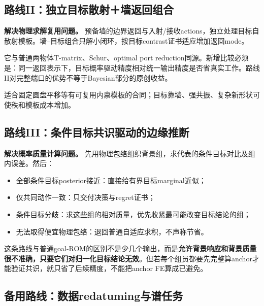 \documentclass[
  10pt,
  a4paper,
]{article}
\providecommand{\tightlist}{%
  \setlength{\itemsep}{0pt}\setlength{\parskip}{0pt}}
\providecommand{\tightlist}{\setlength{\itemsep}{1pt}\setlength{\parskip}{1pt}}
\begin{document}
\hypertarget{ux8defux7ebfiiux72ecux7acbux76eeux6807ux6563ux5c04ux5899ux8fd4ux56deux7ec4ux5408}{%
\subsection{路线II：独立目标散射＋墙返回组合}\label{ux8defux7ebfiiux72ecux7acbux76eeux6807ux6563ux5c04ux5899ux8fd4ux56deux7ec4ux5408}}

\textbf{解决物理求解复用问题。}
预备墙的边界返回与入射/接收actions，独立处理目标自散射模板。墙--目标组合只解小闭环，按目标contrast证书适应增加返回mode。

它与普通两物体T-matrix、Schur、optimal port
reduction同源。新增比较必须是：同一返回表示下，目标概率驱动精度相对统一输出精度是否省真实工作。路线II对完整端口的优势不等于Bayesian部分的原创收益。

适合固定圆盘平移等有可复用内禀模板的合同；目标靠墙、强共振、复杂新形状可使秩和模板成本增加。

\hypertarget{ux8defux7ebfiiiux6761ux4ef6ux76eeux6807ux5171ux8bc6ux9a71ux52a8ux7684ux8fb9ux7f18ux63a8ux65ad}{%
\subsection{路线III：条件目标共识驱动的边缘推断}\label{ux8defux7ebfiiiux6761ux4ef6ux76eeux6807ux5171ux8bc6ux9a71ux52a8ux7684ux8fb9ux7f18ux63a8ux65ad}}

\textbf{解决概率质量计算问题。}
先用物理包络组织背景组，求代表的条件目标对比及组内误差。然后：

\begin{itemize}
\tightlist
\item
  全部条件目标posterior接近：直接给有界目标marginal近似；
\item
  仅共同动作一致：只交付决策与regret证书；
\item
  条件目标分歧：求这些组的相对质量，优先收紧最可能改变目标结论的组；
\item
  无法取得便宜物理包络：退回普通自适应求积，不声称节省。
\end{itemize}

这条路线与普通goal-ROM的区别不是少几个输出，而是\textbf{允许背景响应和背景质量很不准确，只要它们对归一化目标结论无效}。但若每个组员都要先完整算anchor才能验证共识，就只省了后续精度，不能把anchor
FE算成已避免。

\hypertarget{ux5907ux7528ux8defux7ebfux6570ux636eredatumingux4e0eux8c31ux4efbux52a1}{%
\subsection{备用路线：数据redatuming与谱任务}\label{ux5907ux7528ux8defux7ebfux6570ux636eredatumingux4e0eux8c31ux4efbux52a1}}
\end{document}

